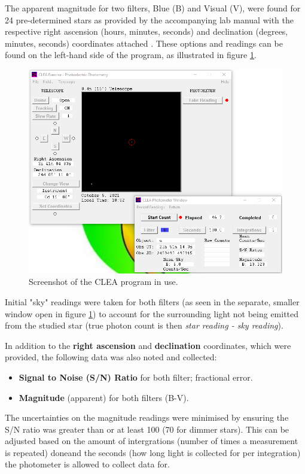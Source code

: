 \documentclass[12pt]{article}
\begin{document}
The apparent magnitude for two filters, Blue (B) and Visual (V), were found for 24 pre-determined stars as provided by the accompanying lab manual with the respective
right ascension (hours, minutes, seconds) and declination (degrees, minutes, seconds) coordinates attached \cite{UCDsm}.
These options and readings can be found on the left-hand side of the program, as illustrated in figure \ref{fig:program}.

\begin{figure}[H]
    \centering
    \includegraphics[width=.9\linewidth]{SMscreenshot_program.png}
    \caption{\centering Screenshot of the CLEA program in use.}
    \label{fig:program}
\end{figure}

Initial "sky" readings were taken for both filters (as seen in the separate, smaller window open in figure \ref{fig:program}) to account for the surrounding light not being emitted
from the studied star (true photon count is then \textit{star reading - sky reading}).

In addition to the \textbf{right ascension} and \textbf{declination} coordinates, which were provided, the following data was also noted and collected:

\begin{itemize}
    \item \textbf{Signal to Noise (S/N) Ratio} for both filter; fractional error.
    \item \textbf{Magnitude} (apparent) for both filters (B-V).
\end{itemize}

The uncertainties on the magnitude readings were minimised by ensuring the S/N ratio was greater than or at least 100 (70 for dimmer stars). This can be adjusted based on the amount of intergrations 
(number of times a measurement is repeated) doneand the seconds (how long light is collected for per integration) the photometer is allowed to collect data for. 
\end{document}
